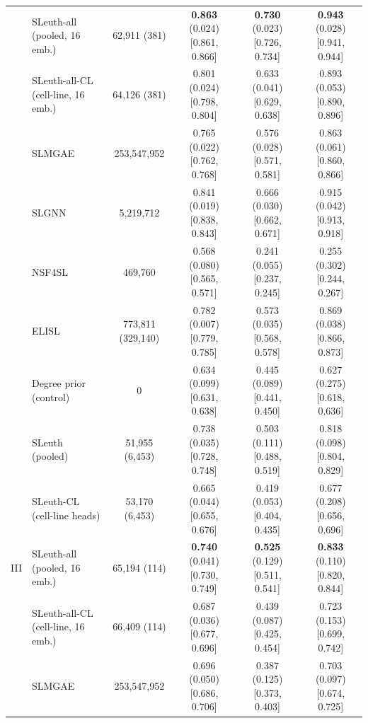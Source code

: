 \begin{tabular}{ll|cccc}
 & SLeuth-all (pooled, 16 emb.) & 62{,}911 (381) & \textbf{0.863} (0.024) {\scriptsize [0.861, 0.866]} & \textbf{0.730} (0.023) {\scriptsize [0.726, 0.734]} & \textbf{0.943} (0.028) {\scriptsize [0.941, 0.944]} \\
 & SLeuth-all-CL (cell-line, 16 emb.) & 64{,}126 (381) & 0.801 (0.024) {\scriptsize [0.798, 0.804]} & 0.633 (0.041) {\scriptsize [0.629, 0.638]} & 0.893 (0.053) {\scriptsize [0.890, 0.896]} \\
 & SLMGAE & 253{,}547{,}952 & 0.765 (0.022) {\scriptsize [0.762, 0.768]} & 0.576 (0.028) {\scriptsize [0.571, 0.581]} & 0.863 (0.061) {\scriptsize [0.860, 0.866]} \\
 & SLGNN & 5{,}219{,}712 & 0.841 (0.019) {\scriptsize [0.838, 0.843]} & 0.666 (0.030) {\scriptsize [0.662, 0.671]} & 0.915 (0.042) {\scriptsize [0.913, 0.918]} \\
 & NSF4SL & 469{,}760 & 0.568 (0.080) {\scriptsize [0.565, 0.571]} & 0.241 (0.055) {\scriptsize [0.237, 0.245]} & 0.255 (0.302) {\scriptsize [0.244, 0.267]} \\
 & ELISL & 773{,}811 (329{,}140) & 0.782 (0.007) {\scriptsize [0.779, 0.785]} & 0.573 (0.035) {\scriptsize [0.568, 0.578]} & 0.869 (0.038) {\scriptsize [0.866, 0.873]} \\
 & Degree prior (control) & 0 & 0.634 (0.099) {\scriptsize [0.631, 0.638]} & 0.445 (0.089) {\scriptsize [0.441, 0.450]} & 0.627 (0.275) {\scriptsize [0.618, 0.636]} \\
\hline
\multirow{9}{*}{III} & SLeuth (pooled) & 51{,}955 (6{,}453) & 0.738 (0.035) {\scriptsize [0.728, 0.748]} & 0.503 (0.111) {\scriptsize [0.488, 0.519]} & 0.818 (0.098) {\scriptsize [0.804, 0.829]} \\
 & SLeuth-CL (cell-line heads) & 53{,}170 (6{,}453) & 0.665 (0.044) {\scriptsize [0.655, 0.676]} & 0.419 (0.053) {\scriptsize [0.404, 0.435]} & 0.677 (0.208) {\scriptsize [0.656, 0.696]} \\
 & SLeuth-all (pooled, 16 emb.) & 65{,}194 (114) & \textbf{0.740} (0.041) {\scriptsize [0.730, 0.749]} & \textbf{0.525} (0.129) {\scriptsize [0.511, 0.541]} & \textbf{0.833} (0.110) {\scriptsize [0.820, 0.844]} \\
 & SLeuth-all-CL (cell-line, 16 emb.) & 66{,}409 (114) & 0.687 (0.036) {\scriptsize [0.677, 0.696]} & 0.439 (0.087) {\scriptsize [0.425, 0.454]} & 0.723 (0.153) {\scriptsize [0.699, 0.742]} \\
 & SLMGAE & 253{,}547{,}952 & 0.696 (0.050) {\scriptsize [0.686, 0.706]} & 0.387 (0.125) {\scriptsize [0.373, 0.403]} & 0.703 (0.097) {\scriptsize [0.674, 0.725]} \\

\end{tabular}
